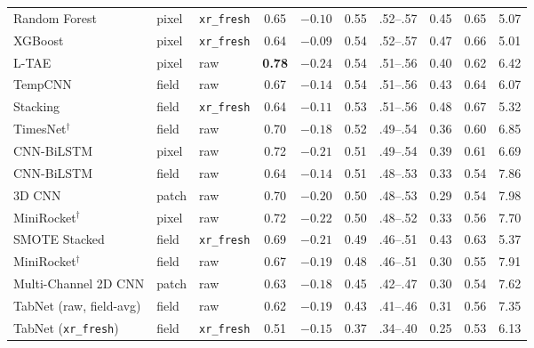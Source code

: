 \documentclass[preprint,authoryear]{elsarticle}
\begin{document}
\begin{longtable}{lllccccccc}
Random Forest         & pixel & \texttt{xr\_fresh} & 0.65 & $-0.10$ & 0.55 & .52--.57 & 0.45 & 0.65 & 5.07 \\
XGBoost               & pixel & \texttt{xr\_fresh} & 0.64 & $-0.09$ & 0.54 & .52--.57 & 0.47 & 0.66 & 5.01 \\
L-TAE                 & pixel & raw & \textbf{0.78} & $-0.24$ & 0.54 & .51--.56 & 0.40 & 0.62 & 6.42 \\
TempCNN               & field & raw & 0.67 & $-0.14$ & 0.54 & .51--.56 & 0.43 & 0.64 & 6.07 \\
Stacking              & field & \texttt{xr\_fresh} & 0.64 & $-0.11$ & 0.53 & .51--.56 & 0.48 & 0.67 & 5.32 \\
TimesNet$^{\dagger}$ & field & raw & 0.70 & $-0.18$ & 0.52 & .49--.54 & 0.36 & 0.60 & 6.85 \\
CNN-BiLSTM            & pixel & raw & 0.72 & $-0.21$ & 0.51 & .49--.54 & 0.39 & 0.61 & 6.69 \\
CNN-BiLSTM            & field & raw & 0.64 & $-0.14$ & 0.51 & .48--.53 & 0.33 & 0.54 & 7.86 \\
3D CNN                & patch & raw & 0.70 & $-0.20$ & 0.50 & .48--.53 & 0.29 & 0.54 & 7.98 \\
MiniRocket$^{\dagger}$ & pixel & raw & 0.72 & $-0.22$ & 0.50 & .48--.52 & 0.33 & 0.56 & 7.70 \\
SMOTE Stacked         & field & \texttt{xr\_fresh} & 0.69 & $-0.21$ & 0.49 & .46--.51 & 0.43 & 0.63 & 5.37 \\
MiniRocket$^{\dagger}$ & field & raw & 0.67 & $-0.19$ & 0.48 & .46--.51 & 0.30 & 0.55 & 7.91 \\
Multi-Channel 2D CNN  & patch & raw & 0.63 & $-0.18$ & 0.45 & .42--.47 & 0.30 & 0.54 & 7.62 \\
TabNet (raw, field-avg) & field & raw & 0.62 & $-0.19$ & 0.43 & .41--.46 & 0.31 & 0.56 & 7.35 \\
TabNet (\texttt{xr\_fresh}) & field & \texttt{xr\_fresh} & 0.51 & $-0.15$ & 0.37 & .34--.40 & 0.25 & 0.53 & 6.13 \\
\end{longtable}
\vspace{-6pt}
\endgroup
\end{document}
